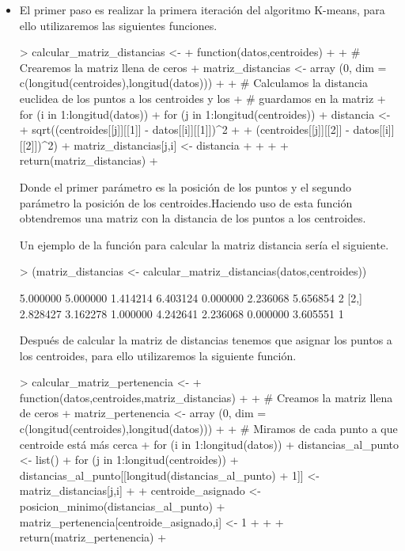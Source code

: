 \documentclass[parskip=full]{scrartcl}
\begin{document}
\begin{itemize}
    \item El primer paso es realizar la primera iteración del algoritmo K-means, para ello utilizaremos las siguientes funciones.


\begin{Schunk}
\begin{Sinput}
> calcular_matriz_distancias <- 
+ function(datos,centroides){
+ 
+ # Crearemos la matriz llena de ceros
+ matriz_distancias <- array (0, dim = c(longitud(centroides),longitud(datos)))
+ 
+ # Calculamos la distancia euclidea de los puntos a los centroides y los 
+ # guardamos en la matriz
+ for (i in 1:longitud(datos)){
+ for (j in 1:longitud(centroides)){
+ distancia <- 
+ sqrt((centroides[[j]][[1]] - datos[[i]][[1]])^2 + 
+ (centroides[[j]][[2]] - datos[[i]][[2]])^2)
+ matriz_distancias[j,i] <- distancia
+ }
+ }
+ 
+ return(matriz_distancias)
+ }
\end{Sinput}
\end{Schunk}


    Donde el primer parámetro es la posición de los puntos y el segundo parámetro la posición de los centroides.Haciendo uso de esta función obtendremos una matriz con la distancia de los puntos a los centroides.

    Un ejemplo de la función para calcular la matriz distancia sería el siguiente.


\begin{Schunk}
\begin{Sinput}
>     (matriz_distancias <- calcular_matriz_distancias(datos,centroides))
\end{Sinput}
\begin{Soutput}
         [,1]     [,2]     [,3]     [,4]     [,5]     [,6]     [,7] [,8]
[1,] 5.000000 5.000000 1.414214 6.403124 0.000000 2.236068 5.656854    2
[2,] 2.828427 3.162278 1.000000 4.242641 2.236068 0.000000 3.605551    1
\end{Soutput}
\end{Schunk}


    Después de calcular la matriz de distancias tenemos que asignar los puntos a los centroides, para ello utilizaremos la siguiente función.


\begin{Schunk}
\begin{Sinput}
> calcular_matriz_pertenencia <- 
+ function(datos,centroides,matriz_distancias){
+ 
+ # Creamos la matriz llena de ceros
+ matriz_pertenencia <- array (0, dim = c(longitud(centroides),longitud(datos)))
+ 
+ # Miramos de cada punto a que centroide está más cerca
+ for (i in 1:longitud(datos)){
+ distancias_al_punto <- list()
+ for (j in 1:longitud(centroides)){
+ distancias_al_punto[[longitud(distancias_al_punto) + 1]] <- matriz_distancias[j,i]
+ }
+ centroide_asignado <- posicion_minimo(distancias_al_punto)
+ matriz_pertenencia[centroide_asignado,i] <- 1
+ }
+     
+     return(matriz_pertenencia)
+ }
\end{Sinput}
\end{Schunk}



\end{itemize}
\end{document}
